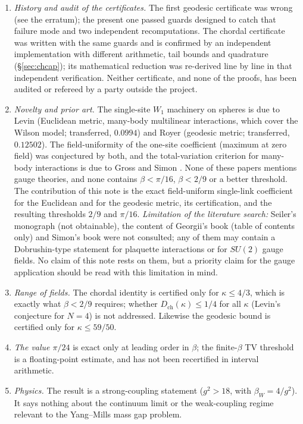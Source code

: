 \documentclass[11pt,a4paper]{article}
\theoremstyle{remark}
\theoremstyle{definition}
\newcommand{\Dch}{D_{\mathrm{ch}}}
\begin{document}
\begin{enumerate}
\item \emph{History and audit of the certificates.} The first geodesic certificate was wrong (see the erratum);
the present one passed guards designed to catch that failure mode and two independent recomputations. The chordal
certificate was written with the same guards and is confirmed by an independent implementation with different
arithmetic, tail bounds and quadrature (\S\ref{sec:chcap}); its mathematical reduction was re-derived line by line
in that independent verification. Neither certificate, and none of the proofs, has been audited or refereed by a
party outside the project.
\item \emph{Novelty and prior art.} The single-site $W_1$ machinery on spheres is due to Levin \cite{Lev80}
(Euclidean metric, many-body multilinear interactions, which cover the Wilson model; transferred, $0.0994$)
and Royer \cite{Roy86} (geodesic metric; transferred, $0.12502$). The field-uniformity of the one-site
coefficient (maximum at zero field) was conjectured by both, and the total-variation criterion for many-body
interactions is due to Gross \cite{Gro79} and Simon \cite{Sim79}. None of these papers mentions gauge theories,
and none contains $\beta<\pi/16$, $\beta<2/9$ or a better threshold. The contribution of this note is the exact
field-uniform single-link coefficient for the Euclidean and for the geodesic metric, its certification, and the
resulting thresholds $2/9$ and $\pi/16$.
\emph{Limitation of the literature search:} Seiler's monograph \cite{Sei82} (not obtainable), the content of
Georgii's book \cite{Geo88} (table of contents only) and Simon's book \cite{Sim93} were not consulted; any of them
may contain a Dobrushin-type statement for plaquette interactions or for $SU(2)$ gauge fields. No claim of this
note rests on them, but a priority claim for the gauge application should be read with this limitation in mind.
\item \emph{Range of fields.} The chordal identity is certified only for $\kappa\le4/3$, which is exactly what
$\beta<2/9$ requires; whether $\Dch(\kappa)\le1/4$ for all $\kappa$ (Levin's conjecture for $N=4$) is not
addressed. Likewise the geodesic bound is certified only for $\kappa\le59/50$.
\item \emph{The value $\pi/24$} is exact only at leading order in $\beta$; the finite-$\beta$ TV threshold is a
floating-point estimate, and has not been recertified in interval arithmetic.
\item \emph{Physics.} The result is a strong-coupling statement ($g^2>18$, with $\beta_W=4/g^2$). It says nothing
about the continuum limit or the weak-coupling regime relevant to the Yang--Mills mass gap problem.
\end{enumerate}
\end{document}
